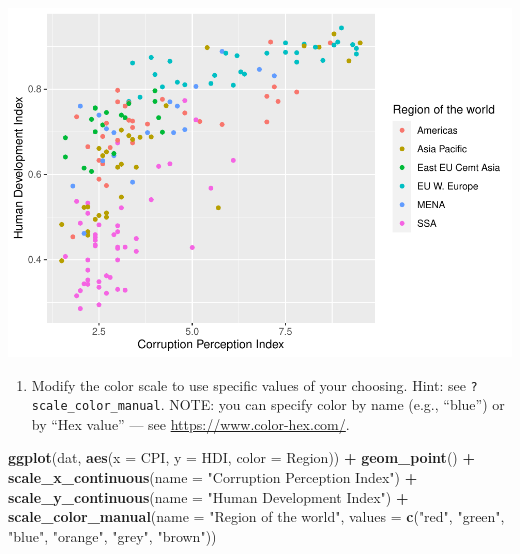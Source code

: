 \documentclass[
]{book}
\newenvironment{Shaded}{\begin{snugshade}}{\end{snugshade}}
\newcommand{\DataTypeTok}[1]{\textcolor[rgb]{0.13,0.29,0.53}{#1}}
\newcommand{\KeywordTok}[1]{\textcolor[rgb]{0.13,0.29,0.53}{\textbf{#1}}}
\newcommand{\NormalTok}[1]{#1}
\newcommand{\OperatorTok}[1]{\textcolor[rgb]{0.81,0.36,0.00}{\textbf{#1}}}
\newcommand{\StringTok}[1]{\textcolor[rgb]{0.31,0.60,0.02}{#1}}
\providecommand{\tightlist}{%
  \setlength{\itemsep}{0pt}\setlength{\parskip}{0pt}}
\begin{document}
\begin{alert}
\includegraphics{R/Rgraphics/figures/unnamed-chunk-191-1.pdf}

\begin{enumerate}
\def\labelenumi{\arabic{enumi}.}
\setcounter{enumi}{2}
\tightlist
\item
  Modify the color scale to use specific values of your choosing. Hint: see \texttt{?scale\_color\_manual}. NOTE: you can specify color by name (e.g., ``blue'') or by ``Hex value'' --- see \url{https://www.color-hex.com/}.
\end{enumerate}

\begin{Shaded}
\begin{Highlighting}[]
\KeywordTok{ggplot}\NormalTok{(dat, }\KeywordTok{aes}\NormalTok{(}\DataTypeTok{x =}\NormalTok{ CPI, }\DataTypeTok{y =}\NormalTok{ HDI, }\DataTypeTok{color =}\NormalTok{ Region)) }\OperatorTok{+}
\StringTok{  }\KeywordTok{geom\_point}\NormalTok{() }\OperatorTok{+}
\StringTok{  }\KeywordTok{scale\_x\_continuous}\NormalTok{(}\DataTypeTok{name =} \StringTok{"Corruption Perception Index"}\NormalTok{) }\OperatorTok{+}
\StringTok{  }\KeywordTok{scale\_y\_continuous}\NormalTok{(}\DataTypeTok{name =} \StringTok{"Human Development Index"}\NormalTok{) }\OperatorTok{+}
\StringTok{  }\KeywordTok{scale\_color\_manual}\NormalTok{(}\DataTypeTok{name =} \StringTok{"Region of the world"}\NormalTok{,}
                     \DataTypeTok{values =} \KeywordTok{c}\NormalTok{(}\StringTok{"red"}\NormalTok{, }\StringTok{"green"}\NormalTok{, }\StringTok{"blue"}\NormalTok{, }\StringTok{"orange"}\NormalTok{, }\StringTok{"grey"}\NormalTok{, }\StringTok{"brown"}\NormalTok{))}
\end{Highlighting}
\end{Shaded}


\end{alert}
\end{document}
